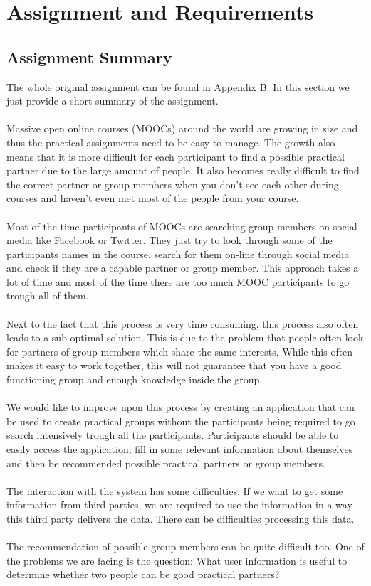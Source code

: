 \chapter{Assignment and Requirements}

\section{Assignment Summary}
The whole original assignment can be found in Appendix B. In this section we just provide a short summary of the assignment. 
\\\\
Massive open online courses (MOOCs) around the world are growing in size and thus the practical assignments need to be easy to manage.
The growth also means that it is more difficult for each participant to find a possible practical partner due to the large amount of people.
It also becomes really difficult to find the correct partner or group members when you don't see each other during courses and haven't even met most of the people from your course.
\\\\
Most of the time participants of MOOCs are searching group members on social media like Facebook or Twitter.
They just try to look through some of the participants names in the course, search for them on-line through social media and check if they are a capable partner or group member.
This approach takes a lot of time and most of the time there are too much MOOC participants to go trough all of them.
\\\\
Next to the fact that this process is very time consuming, this process also often leads to a sub optimal solution.
This is due to the problem that people often look for partners of group members which share the same interests.
While this often makes it easy to work together, this will not guarantee that you have a good functioning group and enough knowledge inside the group.
\\\\
We would like to improve upon this process by creating an application that can be used to create practical groups without the participants being required to go search intensively trough all the participants.
Participants should be able to easily access the application, fill in some relevant information about themselves and then be recommended possible practical partners or group members.
\\\\
The interaction with the system has some difficulties.
If we want to get some information from third parties, we are required to use the information in a way this third party delivers the data.
There can be difficulties processing this data.
\\\\
The recommendation of possible group members can be quite difficult too.
One of the problems we are facing is the question: What user information is useful to determine whether two people can be good practical partners?

